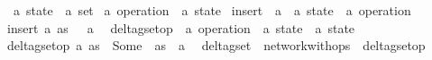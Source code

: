 \begin{isabellebody}
\isamarkupfalse%
\ {\isacharparenleft}{\isacharprime}a{\isacharparenright}\ state\ {\isacharequal}\ {\isachardoublequoteopen}{\isacharprime}a\ set{\isachardoublequoteclose}\isanewline
{}\isamarkupfalse%
\ {\isacharparenleft}{\isacharprime}a{\isacharparenright}\ operation\ {\isacharequal}\ {\isachardoublequoteopen}{\isacharprime}a\ state{\isachardoublequoteclose}\isanewline
\isanewline
{}\isamarkupfalse%
\ insert\ {\isacharcolon}{\isacharcolon}\ {\isachardoublequoteopen}{\isacharprime}a\ {\isasymRightarrow}\ {\isacharparenleft}{\isacharprime}a\ state{\isacharparenright}\ {\isasymRightarrow}\ {\isacharparenleft}{\isacharprime}a\ operation{\isacharparenright}{\isachardoublequoteclose}\ \isanewline
{\isachardoublequoteopen}insert\ a\ as\ {\isacharequal}\ {\isacharbraceleft}\ a\ {\isacharbraceright}{\isachardoublequoteclose}\isanewline
\isanewline
{}\isamarkupfalse%
\ delta{\isacharunderscore}gset{\isacharunderscore}op\ {\isacharcolon}{\isacharcolon}\ {\isachardoublequoteopen}{\isacharparenleft}{\isacharprime}a\ operation{\isacharparenright}\ {\isasymRightarrow}\ {\isacharparenleft}{\isacharprime}a\ state{\isacharparenright}\ {\isasymrightharpoonup}\ {\isacharparenleft}{\isacharprime}a\ state{\isacharparenright}{\isachardoublequoteclose}\ \isanewline
{\isachardoublequoteopen}delta{\isacharunderscore}gset{\isacharunderscore}op\ a\ as\ {\isacharequal}\ Some\ {\isacharparenleft}\ as\ {\isasymunion}\ a\ {\isacharparenright}{\isachardoublequoteclose}\isanewline
\isanewline
{}\isamarkupfalse%
\ delta{\isacharunderscore}gset\ {\isacharequal}\ network{\isacharunderscore}with{\isacharunderscore}ops\ {\isacharunderscore}\ delta{\isacharunderscore}gset{\isacharunderscore}op\ {\isachardoublequoteopen}{\isacharbraceleft}{\isacharbraceright}{\isachardoublequoteclose}\isanewline
\end{isabellebody}%
\endinput
